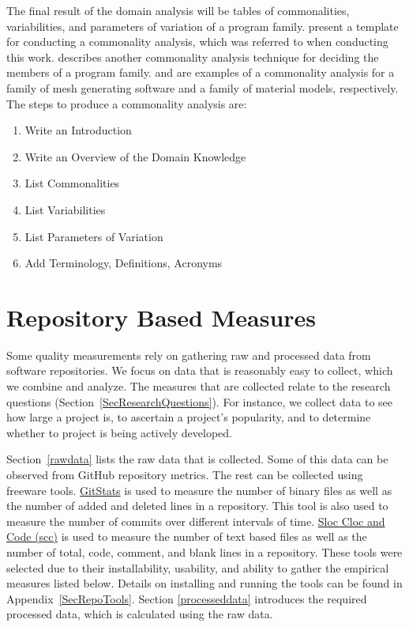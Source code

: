 \documentclass[letterpaper,cleveref]{lipics-v2019}
\begin{document}
The final result of the domain analysis will be tables of commonalities,
variabilities, and parameters of variation of a program family.
\cite{smith2008commonality} present a template for conducting a commonality
analysis, which was referred to when conducting this work.
\cite{weiss1998commonality} describes another commonality analysis technique for
deciding the members of a program family. \cite{SmithAndChen2004} and
\cite{SmithMcCutchanAndCarette2017} are examples of a commonality analysis for a
family of mesh generating software and a family of material models,
respectively. The steps to produce a commonality analysis are:

\begin{enumerate}
\item Write an Introduction
\item Write an Overview of the Domain Knowledge
\item List Commonalities
\item List Variabilities
\item List Parameters of Variation
\item Add Terminology, Definitions, Acronyms
\end{enumerate}


\section{Repository Based Measures} \label{SecEmpiricalMeasures}

Some quality measurements rely on gathering raw and processed data from software
repositories. We focus on data that is reasonably easy to collect, which we
combine and analyze. The measures that are collected relate to the research
questions (Section~\ref{SecResearchQuestions}). For instance, we collect data to
see how large a project is, to ascertain a project’s popularity, and to
determine whether to project is being actively developed.

Section~\ref{rawdata} lists the raw data that is collected.  Some of this data
can be observed from GitHub repository metrics. The rest can be collected using
freeware tools. \href{https://github.com/tomgi/git_stats}{GitStats} is used to
measure the number of binary files as well as the number of added and deleted
lines in a repository. This tool is also used to measure the number of commits
over different intervals of time. \href{https://github.com/boyter/scc}{Sloc Cloc
and Code (scc)} is used to measure the number of text based files as well as the
number of total, code, comment, and blank lines in a repository. These tools
were selected due to their installability, usability, and ability to gather the
empirical measures listed below. Details on installing and running the tools can
be found in Appendix~\ref{SecRepoTools}.  Section \ref{processeddata} introduces
the required processed data, which is calculated using the raw data.
\end{document}
